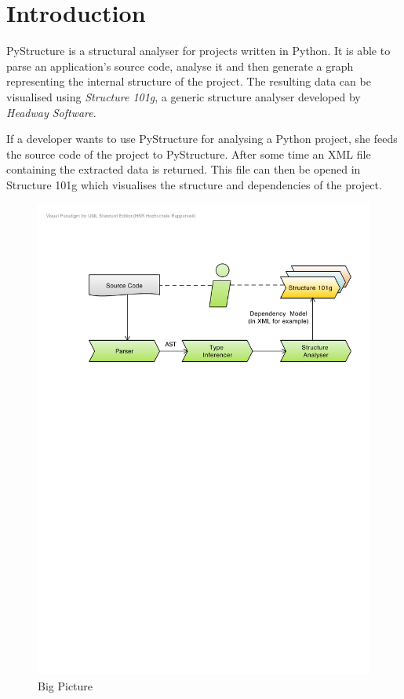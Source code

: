 \documentclass[12pt,halfparskip,DIV11,BCOR10mm]{scrreprt}
\begin{document}
\tableofcontents

\newpage
{}
\pagestyle{scrheadings}

\chapter{Introduction}


PyStructure is a structural analyser for projects written in Python. It is able to parse an application's source code, analyse it and then generate a graph representing the internal structure of the project. The resulting data can be visualised using \emph{Structure 101g}, a generic structure analyser developed by \emph{Headway Software}.

If a developer wants to use PyStructure for analysing a Python project, she feeds the source code of the project to PyStructure. After some time an XML file containing the extracted data is returned. This file can then be opened in Structure 101g which visualises the structure and dependencies of the project.

\begin{figure}[H]
    \centering
    \includegraphics[width=\textwidth]{project/big_picture}
    \caption{Big Picture}
    \label{fig:big_picture}
\end{figure}
\end{document}
